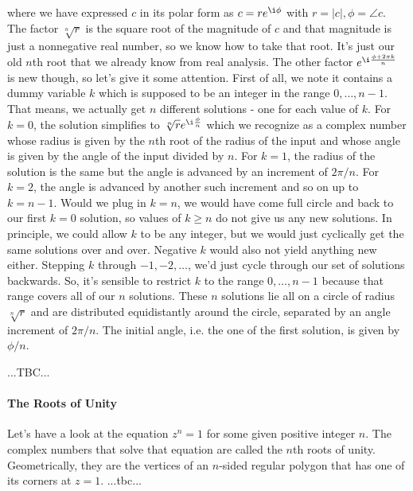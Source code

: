 where we have expressed $c$ in its polar form as $c = r e^{\i \phi}$ with $r = |c|, \phi = \angle c$. The factor $\sqrt[n]{r}$ is the square root of the magnitude of $c$ and that magnitude is just a nonnegative real number, so we know how to take that root. It's just our old $n$th root that we already know from real analysis. The other factor $e^{\i \frac{\phi + 2 \pi k}{n}}$ is new though, so let's give it some attention. First of all, we note it contains a dummy variable $k$ which is supposed to be an integer in the range $0,\ldots,n-1$. That means, we actually get $n$ different solutions - one for each value of $k$. For $k = 0$, the solution simplifies to $\sqrt[n]{r} e^{\i \frac{\phi}{n}}$ which we recognize as a complex number whose radius is given by the $n$th root of the radius of the input and whose angle is given by the angle of the input divided by $n$. For $k=1$, the radius of the solution is the same but the angle is advanced by an increment of $2\pi / n$. For $k=2$, the angle is advanced by another such increment and so on up to $k=n-1$. Would we plug in $k=n$, we would have come full circle and back to our first $k=0$ solution, so values of $k \geq n$ do not give us any new solutions. In principle, we could allow $k$ to be any integer, but we would just cyclically get the same solutions over and over. Negative $k$ would also not yield anything new either. Stepping $k$ through $-1,-2,\ldots$, we'd just cycle through our set of solutions backwards. So, it's sensible to restrict $k$ to the range $0,\ldots,n-1$ because that range covers all of our $n$ solutions. These $n$ solutions lie all on a circle of radius $\sqrt[n]{r}$ and are distributed equidistantly around the circle, separated by an angle increment of $2 \pi / n$. The initial angle, i.e. the one of the first solution, is given by $\phi / n$.

\medskip


%
...TBC...

\paragraph{The Roots of Unity}
Let's have a look at the equation $z^n = 1$ for some given positive integer $n$. The complex numbers that solve that equation are called the $n$th roots of unity. Geometrically, they are the vertices of an $n$-sided regular polygon that has one of its corners at $z = 1$. ...tbc...







